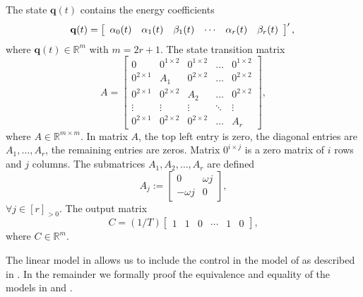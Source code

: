 The state $\mathbf{q}(t)$ contains the energy coefficients
\begin{equation}\label{eq:state-details}
  \mathbf{q}(t)=\left[\begin{array}{cccccc}
    \alpha_0(t) & \alpha_1(t) & \beta_1(t) & \cdots & \alpha_r(t) & \beta_r(t)
  \end{array}\right]',\\
\end{equation}
where $\mathbf{q}(t)\in\mathbb{R}^m$ with $m=2r+1$. The state transition matrix
\begin{equation}\label{eq:mat_A}
  A=\left[\begin{array}{ccccc}
    0            & 0^{1\times 2}& 0^{1\times 2}& \dots& 0^{1\times 2} \\
    0^{2\times 1}& A_1          & 0^{2\times 2}& \dots& 0^{2\times 2} \\
    0^{2\times 1}& 0^{2\times 2}& A_2          & \dots& 0^{2\times 2} \\
    \vdots       & \vdots       & \vdots       &\ddots& \vdots        \\
    0^{2\times 1}& 0^{2\times 2}& 0^{2\times 2}& \dots& A_r 
  \end{array}\right],
\end{equation}
where $A\in\mathbb{R}^{m\times m}$. In matrix $A$, the top left entry is zero, the diagonal entries are $A_1,\dots,A_r$, the remaining entries are zeros. Matrix $0^{i\times j}$ is a zero matrix of $i$ rows and $j$ columns. The submatrices $A_1,A_2,\dots,A_r$ are defined
\begin{equation}
  A_j:=\begin{bmatrix}0 & \omega j \\ -\omega j & 0\end{bmatrix},
\end{equation}
$\forall j\in[r]_{>0}$. The output matrix
\begin{equation}\label{eq:mat_C}
  C=(1/T)\left[\begin{array}{cccccc}
    1 & 1 & 0 &\cdots & 1 & 0
  \end{array}\right],
\end{equation}
where $C\in\mathbb{R}^m$.

The linear model in  allows us to include the control in the model of  as described in . In the remainder we formally proof the equivalence and equality of the models in  and .

